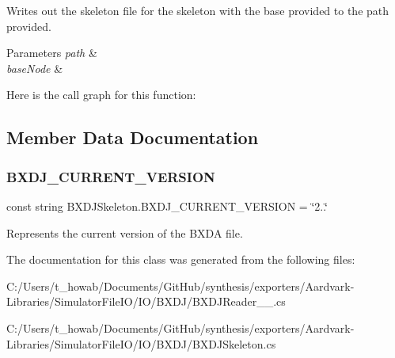 Writes out the skeleton file for the skeleton with the base provided to the path provided. 


\begin{DoxyParams}{Parameters}
{\em path} & \\
\hline
{\em base\+Node} & \\
\hline
\end{DoxyParams}
Here is the call graph for this function\+:


\subsection{Member Data Documentation}
\mbox{\label{class_b_x_d_j_skeleton_ac20054504ce9c44576816cdf9882bd0e}} 
\subsubsection{\texorpdfstring{B\+X\+D\+J\+\_\+\+C\+U\+R\+R\+E\+N\+T\+\_\+\+V\+E\+R\+S\+I\+ON}{BXDJ\_CURRENT\_VERSION}}
{\footnotesize\ttfamily const string B\+X\+D\+J\+Skeleton.\+B\+X\+D\+J\+\_\+\+C\+U\+R\+R\+E\+N\+T\+\_\+\+V\+E\+R\+S\+I\+ON = \char`\"{}2..\char`\"{}}



Represents the current version of the B\+X\+DA file. 



The documentation for this class was generated from the following files\+:\begin{DoxyCompactItemize}
\item 
C\+:/\+Users/t\+\_\+howab/\+Documents/\+Git\+Hub/synthesis/exporters/\+Aardvark-\/\+Libraries/\+Simulator\+File\+I\+O/\+I\+O/\+B\+X\+D\+J/B\+X\+D\+J\+Reader\+\_\+\_.\+cs\item 
C\+:/\+Users/t\+\_\+howab/\+Documents/\+Git\+Hub/synthesis/exporters/\+Aardvark-\/\+Libraries/\+Simulator\+File\+I\+O/\+I\+O/\+B\+X\+D\+J/B\+X\+D\+J\+Skeleton.\+cs\end{DoxyCompactItemize}
